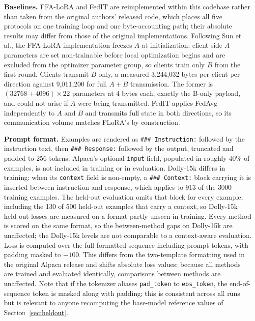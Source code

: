 \textbf{Baselines.} FFA-LoRA \cite{sun2024ffalora} and FedIT \cite{zhang2024federatedgpt} are reimplemented within this codebase rather than taken from the original authors' released code, which places all five protocols on one training loop and one byte-accounting path; their absolute results may differ from those of the original implementations. Following Sun et al., the FFA-LoRA implementation freezes $A$ at initialization: client-side $A$ parameters are set non-trainable before local optimization begins and are excluded from the optimizer parameter group, so clients train only $B$ from the first round. Clients transmit $B$ only, a measured 3{,}244{,}032 bytes per client per direction against 9{,}011{,}200 for full $A{+}B$ transmission. The former is $(32768 + 4096) \times 22$ parameters at 4 bytes each, exactly the B-only payload, and could not arise if $A$ were being transmitted. FedIT applies FedAvg independently to $A$ and $B$ and transmits full state in both directions, so its communication volume matches FLoRA's by construction.

\textbf{Prompt format.} Examples are rendered as \texttt{\#\#\# Instruction:} followed by the instruction text, then \texttt{\#\#\# Response:} followed by the output, truncated and padded to 256 tokens. Alpaca's optional \texttt{input} field, populated in roughly 40\% of examples, is not included in training or in evaluation. Dolly-15k differs in training: when its \texttt{context} field is non-empty, a \texttt{\#\#\# Context:} block carrying it is inserted between instruction and response, which applies to 913 of the 3000 training examples. The held-out evaluation omits that block for every example, including the 130 of 500 held-out examples that carry a context, so Dolly-15k held-out losses are measured on a format partly unseen in training. Every method is scored on the same format, so the between-method gaps on Dolly-15k are unaffected; the Dolly-15k levels are not comparable to a context-aware evaluation. Loss is computed over the full formatted sequence including prompt tokens, with padding masked to $-100$. This differs from the two-template formatting used in the original Alpaca release and shifts absolute loss values; because all methods are trained and evaluated identically, comparisons between methods are unaffected. Note that if the tokenizer aliases \texttt{pad\_token} to \texttt{eos\_token}, the end-of-sequence token is masked along with padding; this is consistent across all runs but is relevant to anyone recomputing the base-model reference values of Section~\ref{sec:heldout}.

